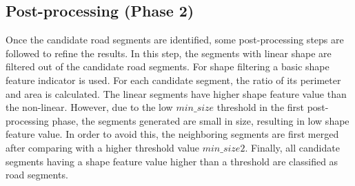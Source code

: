 \documentclass[12pt,twoside]{article}
\theoremstyle{plain}
\theoremstyle{definition}
\theoremstyle{remark}
\begin{document}
\subsection{Post-processing (Phase 2)}
Once the candidate road segments are identified, some post-processing steps are followed to refine the results. In this step, the segments with linear shape are filtered out of the candidate road segments. For shape filtering a basic shape feature indicator is used. For each candidate segment, the ratio of its perimeter and  area is calculated. The linear segments have higher shape feature value than the non-linear. However, due to the low $min\_size$ threshold in the first post-processing phase, the segments generated are small in size, resulting in low shape feature value. In order to avoid this, the neighboring segments are first merged after comparing with a higher threshold value $min\_size2$. Finally, all candidate segments having a shape feature value higher than a threshold are classified as road segments. 
\end{document}
